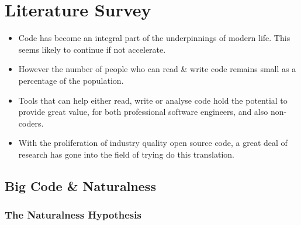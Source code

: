 \chapter{Literature Survey}
\label{literature_survey}

\begin{itemize}
    \item Code has become an integral part of the underpinnings of modern life. This seems likely to continue if not accelerate.
    \item However the number of people who can read \& write code remains small as a percentage of the population. 
    \item Tools that can help either read, write or analyse code hold the potential to provide great value, for both professional software engineers, and also non-coders.
    \item With the proliferation of industry quality open source code, a great deal of research has gone into the field of trying do this translation.
\end{itemize}

\section{Big Code \& Naturalness} %

\subsection{The Naturalness Hypothesis} %
\label{ssub:the_naturalness_hypothesis}

